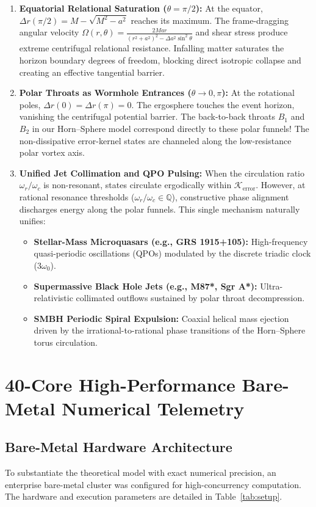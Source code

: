 \documentclass[11pt,a4paper]{article}
\newcommand{\Kerr}{\mathcal{K}_{\text{error}}}
\begin{document}
\begin{enumerate}[label=(\alph*),leftmargin=1.5em]
\item \textbf{Equatorial Relational Saturation ($\theta = \pi/2$):} At the equator, $\Delta r(\pi/2) = M - \sqrt{M^2 - a^2}$ reaches its maximum. The frame-dragging angular velocity $\Omega(r, \theta) = \frac{2Mar}{(r^2 + a^2)^2 - \Delta a^2 \sin^2 \theta}$ and shear stress produce extreme centrifugal relational resistance. Infalling matter saturates the horizon boundary degrees of freedom, blocking direct isotropic collapse and creating an effective tangential barrier.
\item \textbf{Polar Throats as Wormhole Entrances ($\theta \to 0, \pi$):} At the rotational poles, $\Delta r(0) = \Delta r(\pi) = 0$. The ergosphere touches the event horizon, vanishing the centrifugal potential barrier. The back-to-back throats $B_1$ and $B_2$ in our Horn--Sphere model correspond directly to these polar funnels! The non-dissipative error-kernel states are channeled along the low-resistance polar vortex axis.
\item \textbf{Unified Jet Collimation and QPO Pulsing:} When the circulation ratio $\omega_r / \omega_c$ is non-resonant, states circulate ergodically within $\Kerr$. However, at rational resonance thresholds ($\omega_r / \omega_c \in \mathbb{Q}$), constructive phase alignment discharges energy along the polar funnels. This single mechanism naturally unifies:
  \begin{itemize}
    \item \textbf{Stellar-Mass Microquasars (e.g., GRS 1915+105):} High-frequency quasi-periodic oscillations (QPOs) modulated by the discrete triadic clock ($3\omega_0$).
    \item \textbf{Supermassive Black Hole Jets (e.g., M87*, Sgr A*):} Ultra-relativistic collimated outflows sustained by polar throat decompression.
    \item \textbf{SMBH Periodic Spiral Expulsion:} Coaxial helical mass ejection driven by the irrational-to-rational phase transitions of the Horn--Sphere torus circulation.
  \end{itemize}
\end{enumerate}

\section{40-Core High-Performance Bare-Metal Numerical Telemetry}\label{sec:telemetry}

\subsection{Bare-Metal Hardware Architecture}
To substantiate the theoretical model with exact numerical precision, an enterprise bare-metal cluster was configured for high-concurrency computation. The hardware and execution parameters are detailed in Table~\ref{tab:setup}.
\end{document}
